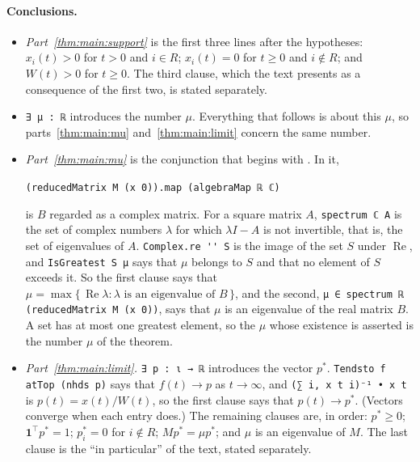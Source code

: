 \documentclass[11pt]{article}
\theoremstyle{definition}
\theoremstyle{remark}
\newcommand{\one}{\mathbf{1}}
\newcommand{\T}{\top}
\renewcommand{\Re}{\operatorname{Re}}
\begin{document}
\paragraph{Conclusions.}
\begin{itemize}[leftmargin=2em]
  \item \emph{Part~\ref{thm:main:support}} is the first three lines after the hypotheses:
        $x_i(t) > 0$ for $t > 0$ and $i \in R$; $x_i(t) = 0$ for $t \ge 0$ and $i \notin R$; and
        $W(t) > 0$ for $t \ge 0$. The third clause, which the text presents as a consequence of
        the first two, is stated separately.
  \item \verb|∃ μ : ℝ| introduces the number $\mu$. Everything that follows is about this $\mu$,
        so parts~\ref{thm:main:mu} and~\ref{thm:main:limit} concern the same number.
  \item \emph{Part~\ref{thm:main:mu}} is the conjunction that begins with .
        In it,
        \begin{center}
        \verb|(reducedMatrix M (x 0)).map (algebraMap ℝ ℂ)|
        \end{center}
        is $B$ regarded as a complex matrix. For a square matrix $A$, \verb|spectrum ℂ A| is the
        set of complex
        numbers $\lambda$ for which $\lambda I - A$ is not invertible, that is, the set of
        eigenvalues of $A$. \verb|Complex.re '' S| is the image of the set $S$ under $\Re$, and
        \verb|IsGreatest S μ| says that $\mu$ belongs to $S$ and that no element of $S$ exceeds
        it. So the first clause says that
        $\mu = \max\{\, \Re\lambda : \lambda \text{ is an eigenvalue of } B \,\}$, and the second,
        \verb|μ ∈ spectrum ℝ (reducedMatrix M (x 0))|, says that $\mu$ is an eigenvalue of the
        real matrix $B$. A set has at most one greatest element, so the $\mu$ whose existence is
        asserted is the number $\mu$ of the theorem.
  \item \emph{Part~\ref{thm:main:limit}.} \verb|∃ p : ι → ℝ| introduces the vector $p^*$.
        \verb|Tendsto f atTop (nhds p)| says that $f(t) \to p$ as $t \to \infty$, and
        \verb|(∑ i, x t i)⁻¹ • x t| is $p(t) = x(t)/W(t)$, so the first clause says that
        $p(t) \to p^*$. (Vectors converge when each entry does.) The remaining clauses are, in
        order: $p^* \ge 0$; $\one^\T p^* = 1$; $p^*_i = 0$ for $i \notin R$; $M p^* = \mu p^*$;
        and $\mu$ is an eigenvalue of $M$. The last clause is the ``in particular'' of the text,
        stated separately.
\end{itemize}
\end{document}
